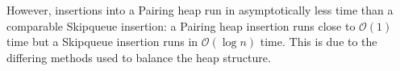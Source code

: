 \documentclass{acm_proc_article-sp}
\begin{document}
However, insertions into a Pairing heap run in asymptotically less time than a comparable Skipqueue insertion: a Pairing heap
insertion runs close to $\mathcal{O}(1)$ time but a Skipqueue insertion runs in $\mathcal{O}(\log n)$ time. This is due
to the differing methods used to balance the heap structure.







\end{document}
